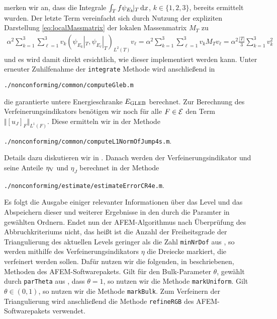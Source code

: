merken wir an, dass die Integrale $\int_T f\psi_{E_k}\!|_T\,\mathrm{d}x$,
$k\in\{1,2,3\}$, bereits ermittelt wurden.
Der letzte Term vereinfacht sich durch Nutzung der expliziten Darstellung
\eqref{eq:localMassmatrix} der lokalen Massenmatrix $M_T$ zu
\begin{align*}
  \alpha^2 \sum_{k=1}^3 \sum_{\ell=1}^3 
    v_k \left(\psi_{E_k}\!|_T,\psi_{E_\ell}|_T\right)_{L^2(T)}v_\ell
  =
  \alpha^2 \sum_{k=1}^3 \sum_{\ell=1}^3 
    v_k M_T v_\ell
  =
  \alpha^2\frac{|T|}{3}\sum_{k=1}^3 v_k^2
\end{align*}
und es wird damit direkt ersichtlich, wie dieser implementiert werden kann.
Unter erneuter Zuhilfenahme der \texttt{integrate} Methode wird anschließend
in
\begin{center}
  \texttt{./nonconforming/common/computeGleb.m}
\end{center}
die garantierte untere Energieschranke $E_\textup{GLEB}$ berechnet. 
Zur Berechnung des Verfeinerungsindikators benötigen wir noch
für alle $F\in\mathcal{E}$ den Term $\Vert[u_J]_F\Vert_{L^1(F)}$. Diese ermitteln wir
in der Methode 
\begin{center}
  \texttt{./nonconforming/common/computeL1NormOfJump4s.m}.
\end{center} 
Details dazu diskutieren wir in .
Danach werden der Verfeinerungsindikator
und seine Anteile $\eta_\textup{V}$ und $\eta_J$ berechnet in der Methode
\begin{center}
  \texttt{./nonconforming/estimate/estimateErrorCR4e.m}.
\end{center}
Es folgt die Ausgabe einiger relevanter Informationen über das Level und das
Abspeichern dieser und weiterer Ergebnisse in den durch die Paramter in
 gewählten Ordnern.
Endet nun der AFEM-Algorithmus nach Überprüfung des Abbruchkriteriums nicht,
das heißt ist die Anzahl der Freiheitsgrade der Triangulierung des aktuellen
Levels geringer als die Zahl \texttt{minNrDof} aus , so
werden mithilfe des Verfeinerungsindikators $\eta$ die Dreiecke markiert, die
verfeinert werden sollen. 
Dafür nutzen wir die folgenden, in \cite[Abschnitt 1.6]{CGKNRR10}
beschriebenen, Methoden des AFEM-Softwarepakets.
Gilt für den Bulk-Parameter $\theta$, gewählt durch \texttt{parTheta} aus
, dass $\theta=1$, so nutzen
wir die Methode \texttt{markUniform}. Gilt $\theta\in(0,1)$, so nutzen wir
die Methode \texttt{markBulk}.
Zum Verfeinern der Triangulierung wird anschließend die Methode
\texttt{refineRGB} \cite[1.7.2]{CGKNRR10} des AFEM-Softwarepakets verwendet.

